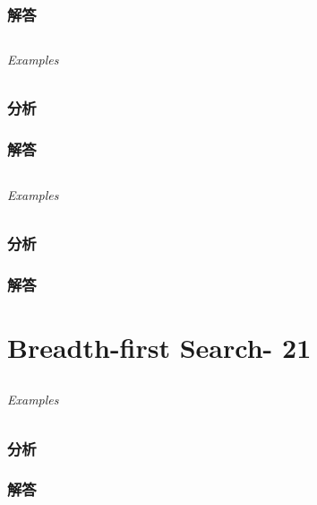 \documentclass[UTF8,a4paper,12pt]{ctexbook}
\begin{document}
	\subsection{解答}
	
	
\section{}
	
	\subparagraph{Examples}
	
	\subsection{分析}
	
	\subsection{解答}
	
\section{}
	
	\subparagraph{Examples}
	
	\subsection{分析}
	
	\subsection{解答}
\chapter{Breadth-first Search- 21}
\section{}
	
	\subparagraph{Examples}
	
	\subsection{分析}
	
	\subsection{解答}
	
\section{}
	
\end{document}
